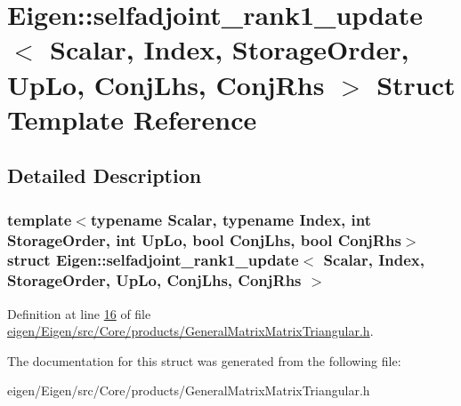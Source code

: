 \hypertarget{struct_eigen_1_1selfadjoint__rank1__update}{}\section{Eigen\+:\+:selfadjoint\+\_\+rank1\+\_\+update$<$ Scalar, Index, Storage\+Order, Up\+Lo, Conj\+Lhs, Conj\+Rhs $>$ Struct Template Reference}
\label{struct_eigen_1_1selfadjoint__rank1__update}


\subsection{Detailed Description}
\subsubsection*{template$<$typename Scalar, typename Index, int Storage\+Order, int Up\+Lo, bool Conj\+Lhs, bool Conj\+Rhs$>$\newline
struct Eigen\+::selfadjoint\+\_\+rank1\+\_\+update$<$ Scalar, Index, Storage\+Order, Up\+Lo, Conj\+Lhs, Conj\+Rhs $>$}



Definition at line \hyperlink{eigen_2_eigen_2src_2_core_2products_2_general_matrix_matrix_triangular_8h_source_l00016}{16} of file \hyperlink{eigen_2_eigen_2src_2_core_2products_2_general_matrix_matrix_triangular_8h_source}{eigen/\+Eigen/src/\+Core/products/\+General\+Matrix\+Matrix\+Triangular.\+h}.



The documentation for this struct was generated from the following file\+:\begin{DoxyCompactItemize}
\item 
eigen/\+Eigen/src/\+Core/products/\+General\+Matrix\+Matrix\+Triangular.\+h\end{DoxyCompactItemize}
